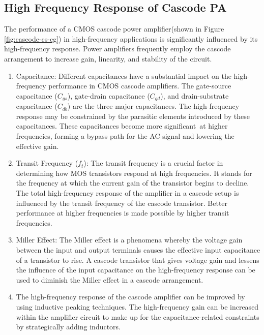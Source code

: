 \subsection{High Frequency Response of Cascode PA}
The performance of a CMOS cascode power amplifier(shown in Figure \ref{fig:cascode-cs-cg}) in high-frequency applications is significantly influenced by its high-frequency response. Power amplifiers frequently employ the cascode arrangement to increase gain, linearity, and stability of the circuit.
\begin{enumerate}[label=\roman*. ]
    \item Capacitance: Different capacitances have a substantial impact on the high-frequency performance in CMOS cascode amplifiers. The gate-source capacitance ($C_{gs}$), gate-drain capacitance ($C_{gd}$), and drain-substrate capacitance ($C_{db}$) are the three major capacitances. The high-frequency response may be constrained by the parasitic elements introduced by these capacitances. These capacitances become more significant at higher frequencies, forming a bypass path for the AC signal and lowering the effective gain.
    \item Transit Frequency ($f_t$): The transit frequency is a crucial factor in determining how MOS transistors respond at high frequencies. It stands for the frequency at which the current gain of the transistor begins to decline. The total high-frequency response of the amplifier in a cascode setup is influenced by the transit frequency of the cascode transistor. Better performance at higher frequencies is made possible by higher transit frequencies.
    \item Miller Effect: The Miller effect is a phenomena whereby the voltage gain between the input and output terminals causes the effective input capacitance of a transistor to rise. A cascode transistor that gives voltage gain and lessens the influence of the input capacitance on the high-frequency response can be used to diminish the Miller effect in a cascode arrangement.
    \item The high-frequency response of the cascode amplifier can be improved by using inductive peaking techniques. The high-frequency gain can be increased within the amplifier circuit to make up for the capacitance-related constraints by strategically adding inductors.
\end{enumerate}
